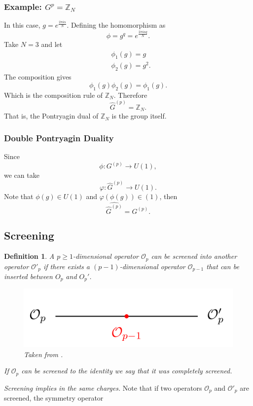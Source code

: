 \documentclass{article}
\newtheorem{definition}{Definition}
\begin{document}
\subsubsection*{Example: $G^{p}=\mathbb{Z}_N$}
In this case, $g=e^{\frac{2\pi i\alpha}{N}}$. Defining the homomorphism as 
\begin{equation}
	\phi=g^q=e^{\frac{2\pi i\alpha q}{N}}.
\end{equation}
Take $N=3$ and let 
\begin{align}
	&\phi_1(g)=g\\
	&\phi_2(g)=g^2. 
\end{align}
The composition gives 
\begin{equation}
	\phi_1(g)\phi_2(g)=\phi_1(g).
\end{equation}
Which is the composition rule of $\mathbb{Z}_N$. Therefore
\begin{equation}
	\widehat{G}^{(p)}=\mathbb{Z}_N.
\end{equation}
That is, the Pontryagin dual of $\mathbb{Z}_N$ is the group itself. 
\subsubsection*{Double Pontryagin Duality}
Since 
\begin{equation}
	\phi:G^{(p)}\to U(1),
\end{equation}
we can take 
\begin{equation}
	\varphi:\widehat{G}^{(p)}\to U(1). 
\end{equation}
Note that $\phi(g)\in U(1)$ and $\varphi(\phi(g))\in (1)$, then 
\begin{equation}
\widehat{\widehat{G}^{(p)}}=G^{(p)}.
\end{equation}

\subsection{Screening}
\begin{definition}
	A $p\geq 1$-dimensional operator $\mathcal{O}_p$ can be screened into another operator $\mathcal{O}'_p$ if there exists a $(p-1)$-dimensional operator $\mathcal{O}_{p-1}$ that can be inserted between $O_p$ and $O_p'$. 
	\begin{figure}[H]
		\centering
		\includegraphics[scale=0.4]{figures/screening.png}
		\caption{Taken from \cite{Bhardwaj}.}
	\end{figure}
If $\mathcal{O}_p$ can be screened to the identity we say that it was completely screened. 
\end{definition}
\textit{Screening implies in the same charges.} Note that if two operators $\mathcal{O}_p$ and $\mathcal{O}'_p$ are screened, the symmetry operator 

\nocite{*}


\end{document}
